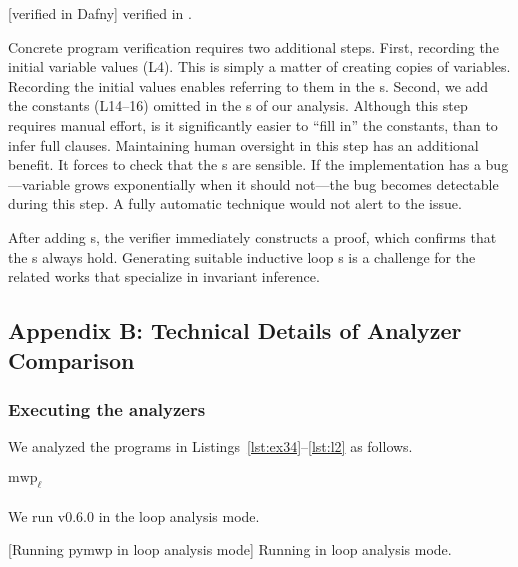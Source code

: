 \begin{center}
\begin{minipage}{\textwidth}
\captionsetup{type=lstlisting}
[\exname verified in Dafny]
{\exname verified in .}
\label{lst:dafny-ex}
\end{minipage}
\end{center}

Concrete program verification requires two additional steps. First, recording
the initial variable values (L4). This is simply a matter of creating copies of
variables. Recording the initial values enables referring to them in the
s. Second, we add the constants (L14--16) omitted in the
s of our analysis. Although this step requires manual effort,
is it significantly easier to \enquote{fill in} the constants, than to infer
full  clauses. Maintaining human oversight in this step has an
additional benefit. It forces to check that the s are sensible.
If the implementation has a bug---\eg variable grows exponentially when it
should not---the bug becomes detectable during this step. A fully automatic
technique would not alert to the issue.

After adding s, the  verifier immediately constructs a
proof, which confirms that the s always hold. Generating suitable
inductive loop s
is a challenge for the related works that specialize in invariant
inference.

\subsection{Appendix B: Technical Details of Analyzer Comparison}
\label{app:sec:comparison}

\subsubsection{Executing the analyzers}\label{subsec:analyzers}

We analyzed the programs in Listings~\ref{lst:ex34}--\ref{lst:l2} as follows.

\paragraph*{$\text{mwp}_\ell$}
We run  v0.6.0 in the loop analysis mode.
\begin{center}
\begin{minipage}{\textwidth}
\captionsetup{type=lstlisting}
[Running pymwp in loop analysis mode]
{Running  in loop analysis mode.}
\label{lst:mwp-bash}
\end{minipage}
\end{center}

